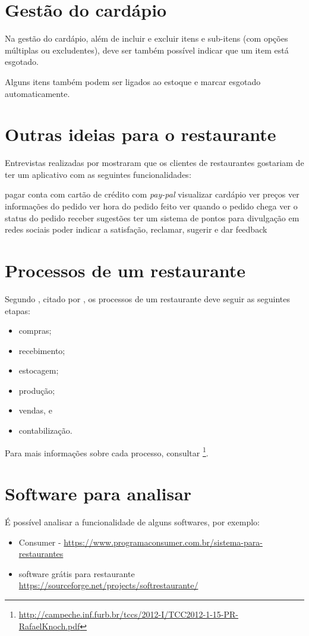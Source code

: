 \section{Gestão do cardápio}

Na gestão do cardápio, além de incluir e excluir itens e sub-itens (com opções múltiplas ou excludentes), deve ser também possível indicar que um item está esgotado.

Alguns itens também podem ser ligados ao estoque e marcar esgotado automaticamente.



\section{Outras ideias para o restaurante}

Entrevistas realizadas por \citet{moreira:2018} mostraram que os  clientes de restaurantes gostariam de ter um aplicativo com as seguintes funcionalidades:
\begin{outline}
\1 pagar conta
\2 com cartão de crédito
\2 com \textit{pay-pal}
\1 visualizar cardápio
\2 ver preços
\1 ver informações do pedido
\2 ver hora do pedido feito
\2 ver quando o pedido chega
\2 ver o status do pedido
\1 receber sugestões
\1 ter um sistema de pontos para divulgação em redes sociais
\1 poder indicar a satisfação, reclamar, sugerir e dar feedback
\end{outline}

\section{Processos de um restaurante}

Segundo \citet{fonseca:2018}, citado por \citet{knock:2011}, os processos de um  restaurante deve seguir as seguintes etapas:
\begin{itemize}
    \item compras;
    \item recebimento;
    \item estocagem;
    \item produção;
    \item vendas, e 
    \item contabilização.
\end{itemize}

Para mais informações sobre cada processo, consultar \citet{knock:2011}\footnote{\url{http://campeche.inf.furb.br/tccs/2012-I/TCC2012-1-15-PR-RafaelKnoch.pdf}}.

\section{Software para analisar}

É possível analisar a funcionalidade de alguns softwares, por exemplo:
\begin{itemize}
    \item Consumer - \url{https://www.programaconsumer.com.br/sistema-para-restaurantes}
    \item software grátis para restaurante  \url{https://sourceforge.net/projects/softrestaurante/}
\end{itemize}


